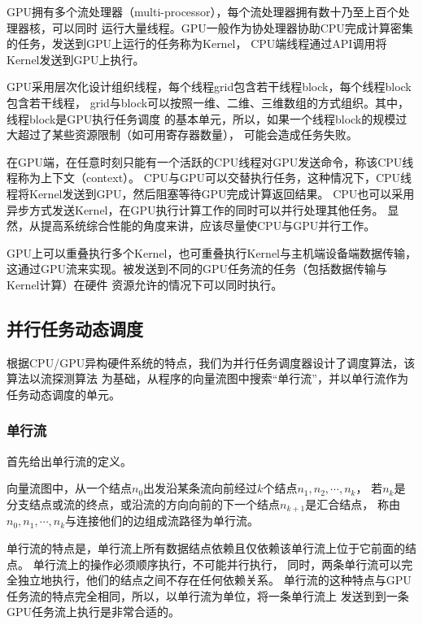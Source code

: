 GPU拥有多个流处理器（multi-processor），每个流处理器拥有数十乃至上百个处理器核，可以同时
运行大量线程。GPU一般作为协处理器协助CPU完成计算密集的任务，发送到GPU上运行的任务称为Kernel，
CPU端线程通过API调用将Kernel发送到GPU上执行。

GPU采用层次化设计组织线程，每个线程grid包含若干线程block，每个线程block包含若干线程，
grid与block可以按照一维、二维、三维数组的方式组织。其中，线程block是GPU执行任务调度
的基本单元，所以，如果一个线程block的规模过大超过了某些资源限制（如可用寄存器数量），
可能会造成任务失败。

在GPU端，在任意时刻只能有一个活跃的CPU线程对GPU发送命令，称该CPU线程称为上下文（context）。
CPU与GPU可以交替执行任务，这种情况下，CPU线程将Kernel发送到GPU，然后阻塞等待GPU完成计算返回结果。
CPU也可以采用异步方式发送Kernel，在GPU执行计算工作的同时可以并行处理其他任务。
显然，从提高系统综合性能的角度来讲，应该尽量使CPU与GPU并行工作。

GPU上可以重叠执行多个Kernel，也可重叠执行Kernel与主机端设备端数据传输，
这通过GPU流来实现。被发送到不同的GPU任务流的任务（包括数据传输与Kernel计算）在硬件
资源允许的情况下可以同时执行。

\subsection{并行任务动态调度}\label{subsec:task-scheduling}
根据CPU/GPU异构硬件系统的特点，我们为并行任务调度器设计了调度算法，该算法以流探测算法
为基础，从程序的向量流图中搜索“单行流”，并以单行流作为任务动态调度的单元。

\subsubsection{单行流}
首先给出单行流的定义。
\begin{definition}
  向量流图中，从一个结点$n_0$出发沿某条流向前经过$k$个结点$n_1, n_2, \cdots, n_k$，
  若$n_k$是分支结点或流的终点，或沿流的方向向前的下一个结点$n_{k+1}$是汇合结点，
  称由$n_0, n_1, \cdots, n_k$与连接他们的边组成流路径为单行流。
\end{definition}

单行流的特点是，单行流上所有数据结点依赖且仅依赖该单行流上位于它前面的结点。
单行流上的操作必须顺序执行，不可能并行执行，
同时，两条单行流可以完全独立地执行，他们的结点之间不存在任何依赖关系。
单行流的这种特点与GPU任务流的特点完全相同，所以，以单行流为单位，将一条单行流上
发送到到一条GPU任务流上执行是非常合适的。

\begin{quotation}
\end{quotation}

